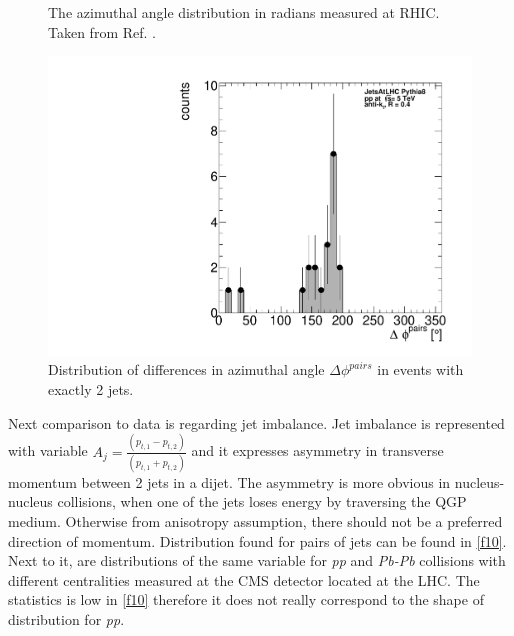 \documentclass[a4paper,10pt]{article}
\begin{document}
\begin{figure}[htbp]
\begin{minipage}{0.33\textwidth}
    \caption{The azimuthal angle distribution in radians measured at RHIC. Taken from Ref. \cite{jetSTAR}.}
    \label{f9}   
    \end{minipage}
    \begin{minipage}{0.33\textwidth}\hfill
        \centering
        \includegraphics[width=\textwidth]{figures/hDijetPhi.pdf}
        \caption{Distribution of differences in azimuthal angle $\Delta \phi^{pairs}$ in events with exactly 2 jets.}
        \label{f8}
    \end{minipage}
\end{figure}

Next comparison to data is regarding jet imbalance. Jet imbalance is represented with variable $A_j= \frac{(p_{t,1} - p_{t,2})}{(p_{t,1} + p_{t,2})}$ and it expresses asymmetry in transverse momentum between 2 jets in a dijet. The asymmetry is more obvious in nucleus-nucleus collisions, when one of the jets loses energy by traversing the QGP medium. Otherwise from anisotropy assumption, there should not be a preferred direction of momentum. Distribution found for pairs of jets can be found in \autoref{f10}. Next to it, are distributions of the same variable for \textit{pp} and \textit{Pb-Pb} collisions with different centralities measured at the CMS detector located at the LHC. The statistics is low in \autoref{f10} therefore it does not really correspond to the shape of distribution for \textit{pp}.
\end{document}
